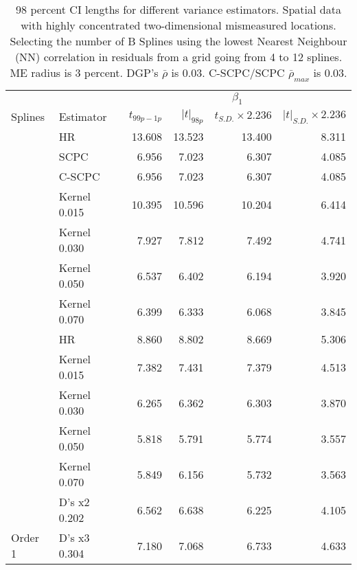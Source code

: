 \documentclass[
]{article}
\begin{document}
\newpage{}

\begin{longtable}[t]{llrrrr}

\caption{\label{tbl-lights-me-optimal-ci-98}98 percent CI lengths for
different variance estimators. Spatial data with highly concentrated
two-dimensional mismeasured locations. Selecting the number of B Splines
using the lowest Nearest Neighbour (NN) correlation in residuals from a
grid going from 4 to 12 splines. ME radius is 3 percent. DGP's
\(\bar\rho\) is 0.03. C-SCPC/SCPC \(\bar\rho_{max}\) is 0.03.}

\tabularnewline

\toprule
\multicolumn{2}{c}{ } & \multicolumn{4}{c}{\(\beta_1\)} \\
\cmidrule(l{3pt}r{3pt}){3-6}
Splines & Estimator & $t_{99p-1p} $ & $|t|_{98p} $ & $t_{S.D.}\times 2.236 $ & $|t|_{S.D.}\times 2.236 $\\
\midrule
 & HR & 13.608 & 13.523 & 13.400 & 8.311\\

 & SCPC & 6.956 & 7.023 & 6.307 & 4.085\\

 & C-SCPC & 6.956 & 7.023 & 6.307 & 4.085\\

 & Kernel 0.015 & 10.395 & 10.596 & 10.204 & 6.414\\

 & Kernel 0.030 & 7.927 & 7.812 & 7.492 & 4.741\\

 & Kernel 0.050 & 6.537 & 6.402 & 6.194 & 3.920\\

\multirow[t]{-7}{*}{\raggedright\arraybackslash } & Kernel 0.070 & 6.399 & 6.333 & 6.068 & 3.845\\
\cmidrule{1-6}
 & HR & 8.860 & 8.802 & 8.669 & 5.306\\

 & Kernel 0.015 & 7.382 & 7.431 & 7.379 & 4.513\\

 & Kernel 0.030 & 6.265 & 6.362 & 6.303 & 3.870\\

 & Kernel 0.050 & 5.818 & 5.791 & 5.774 & 3.557\\

 & Kernel 0.070 & 5.849 & 6.156 & 5.732 & 3.563\\

 & D's x2 0.202 & 6.562 & 6.638 & 6.225 & 4.105\\

\multirow[t]{-7}{*}{\raggedright\arraybackslash Order 1} & D's x3 0.304 & 7.180 & 7.068 & 6.733 & 4.633\\
\bottomrule

\end{longtable}
\end{document}

